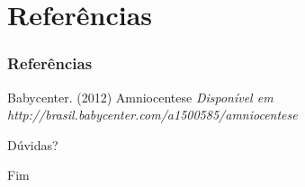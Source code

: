 \documentclass{beamer}
\begin{document}
\section{Referências}


\begin{frame}
\frametitle{Referências}
\footnotesize{
\begin{thebibliography}{9} 

 Babycenter. (2012)
\newblock Amniocentese
\newblock \emph{Disponível em http://brasil.babycenter.com/a1500585/amniocentese}

\end{thebibliography}
}
\end{frame}


\begin{frame}
\Huge{\centerline{Dúvidas?}}
\end{frame}


\begin{frame}
\Huge{\centerline{Fim}}
\end{frame}

\end{document}
